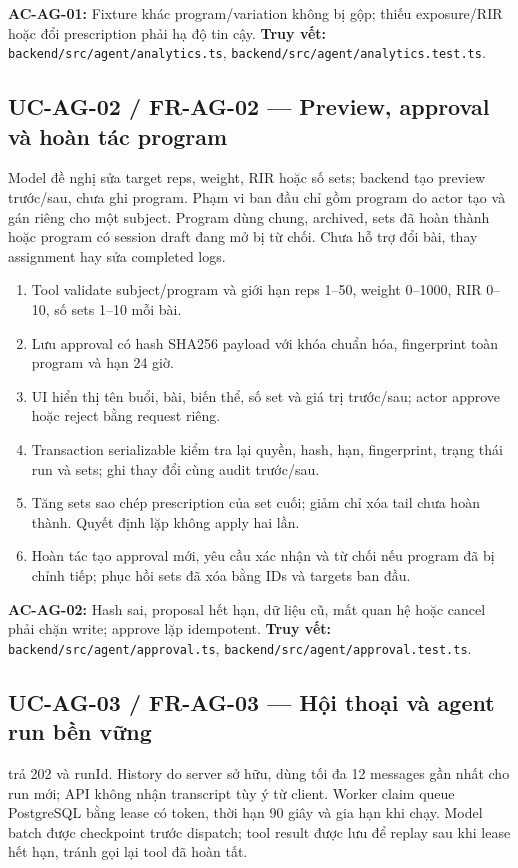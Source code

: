 \documentclass[12pt,a4paper]{article}
\newcommand{\evidence}[1]{{\small\nolinkurl{#1}}}
\begin{document}
\textbf{AC-AG-01:} Fixture khác program/variation không bị gộp; thiếu exposure/RIR hoặc đổi prescription phải hạ độ tin cậy. \textbf{Truy vết:} \evidence{backend/src/agent/analytics.ts}, \evidence{backend/src/agent/analytics.test.ts}.

\subsection{UC-AG-02 / FR-AG-02 --- Preview, approval và hoàn tác program}
Model đề nghị sửa target reps, weight, RIR hoặc số sets; backend tạo preview trước/sau, chưa ghi program. Phạm vi ban đầu chỉ gồm program do actor tạo và gán riêng cho một subject. Program dùng chung, archived, sets đã hoàn thành hoặc program có session draft đang mở bị từ chối. Chưa hỗ trợ đổi bài, thay assignment hay sửa completed logs.

\begin{enumerate}
  \item Tool validate subject/program và giới hạn reps 1--50, weight 0--1000, RIR 0--10, số sets 1--10 mỗi bài.
  \item Lưu approval có hash SHA256 payload với khóa chuẩn hóa, fingerprint toàn program và hạn 24 giờ.
  \item UI hiển thị tên buổi, bài, biến thể, số set và giá trị trước/sau; actor approve hoặc reject bằng request riêng.
  \item Transaction serializable kiểm tra lại quyền, hash, hạn, fingerprint, trạng thái run và sets; ghi thay đổi cùng audit trước/sau.
  \item Tăng sets sao chép prescription của set cuối; giảm chỉ xóa tail chưa hoàn thành. Quyết định lặp không apply hai lần.
  \item Hoàn tác tạo approval mới, yêu cầu xác nhận và từ chối nếu program đã bị chỉnh tiếp; phục hồi sets đã xóa bằng IDs và targets ban đầu.
\end{enumerate}
\textbf{AC-AG-02:} Hash sai, proposal hết hạn, dữ liệu cũ, mất quan hệ hoặc cancel phải chặn write; approve lặp idempotent. \textbf{Truy vết:} \evidence{backend/src/agent/approval.ts}, \evidence{backend/src/agent/approval.test.ts}.

\subsection{UC-AG-03 / FR-AG-03 --- Hội thoại và agent run bền vững}
 trả 202 và runId. History do server sở hữu, dùng tối đa 12 messages gần nhất cho run mới; API không nhận transcript tùy ý từ client. Worker claim queue PostgreSQL bằng lease có token, thời hạn 90 giây và gia hạn khi chạy. Model batch được checkpoint trước dispatch; tool result được lưu để replay sau khi lease hết hạn, tránh gọi lại tool đã hoàn tất.
\end{document}
